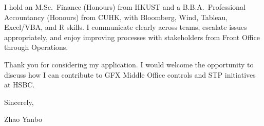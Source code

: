 \documentclass[10pt,a4paper]{article}
\begin{document}
I hold an M.Sc.\ Finance (Honours) from HKUST and a B.B.A.\ Professional Accountancy (Honours) from CUHK, with Bloomberg, Wind, Tableau, Excel/VBA, and R skills. I communicate clearly across teams, escalate issues appropriately, and enjoy improving processes with stakeholders from Front Office through Operations.

Thank you for considering my application. I would welcome the opportunity to discuss how I can contribute to GFX Middle Office controls and STP initiatives at HSBC.

\vspace{1em}

Sincerely,

\vspace{2em}

Zhao Yanbo
\end{document}
